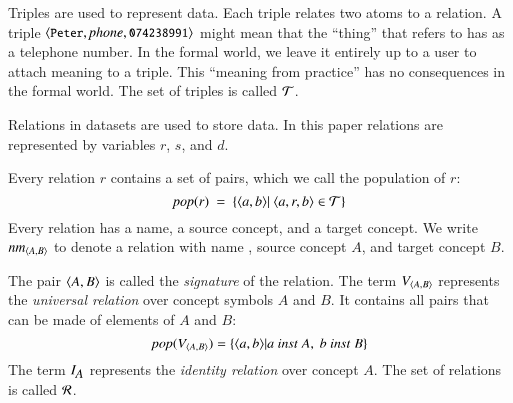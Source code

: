 \documentclass{elsarticle}
\begin{document}
	Triples are used to represent data.
	Each triple relates two atoms to a relation.
	A triple $\langle{\text{{\tt\small Peter}}},{\text{\it phone\/}},{\text{{\tt\small 074238991}}}\rangle$ might mean that the ``thing'' that  refers to
	has  as a telephone number.
	In the formal world, we leave it entirely up to a user to attach meaning to a triple.
	This ``meaning from practice'' has no consequences in the formal world.
	The set of triples is called $\mathcal{T}$.

	Relations in datasets are used to store data.
	In this paper relations are represented by variables $r$, $s$, and $d$.

	Every relation $r$ contains a set of pairs, which we call the population of $r$:
\begin{equation}
	\pop{r}\ =\ \{ \pair{a}{b}|\ \triple{a}{r}{b}\in\triples\}
\end{equation}
	Every relation has a name, a source concept, and a target concept.
	We write $\text{\it nm\/}_{\langle{A},{B}\rangle}$ to denote a relation with name , source concept $A$, and target concept $B$.

	The pair $\langle{A},{B}\rangle$ is called the \emph{signature} of the relation.
	The term $V_{\langle{A},{B}\rangle}$ represents the \emph{universal relation} over concept symbols $A$ and $B$.
	It contains all pairs that can be made of elements of $A$ and $B$:
\[\pop{\fullt{A}{B}} = \{ \pair{a}{b}| a\ \inst\ A,\ b\ \inst\ B \}\]
	The term $I_{\text{\it \small A\/}}$ represents the \emph{identity relation} over concept $A$.
	The set of relations is called $\mathcal{R}$.
	
\end{document}
